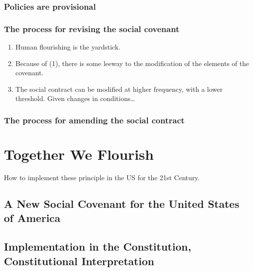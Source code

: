 \documentclass[
]{book}
\providecommand{\tightlist}{%
  \setlength{\itemsep}{0pt}\setlength{\parskip}{0pt}}
\begin{document}
\hypertarget{policies-are-provisional}{%
\section{Policies are provisional}\label{policies-are-provisional}}

\hypertarget{the-process-for-revising-the-social-covenant}{%
\section{The process for revising the social covenant}\label{the-process-for-revising-the-social-covenant}}

\begin{enumerate}
\def\labelenumi{\arabic{enumi}.}
\tightlist
\item
  Human flourishing is the yardstick.
\item
  Because of (1), there is some leeway to the modification of the
  elements of the covenant.
\item
  The social contract can be modified at higher frequency, with a
  lower threshold. Given changes in conditions\ldots{}
\end{enumerate}

\hypertarget{the-process-for-amending-the-social-contract}{%
\section{The process for amending the social contract}\label{the-process-for-amending-the-social-contract}}

\hypertarget{part-together-we-flourish}{%
\part{Together We Flourish}\label{part-together-we-flourish}}

How to implement these principle in the US for the 21st Century.

\hypertarget{a-new-social-covenant-for-the-united-states-of-america}{%
\chapter{A New Social Covenant for the United States of America}\label{a-new-social-covenant-for-the-united-states-of-america}}

\hypertarget{implementation-in-the-constitution-constitutional-interpretation}{%
\chapter{Implementation in the Constitution, Constitutional Interpretation}\label{implementation-in-the-constitution-constitutional-interpretation}}
\end{document}
